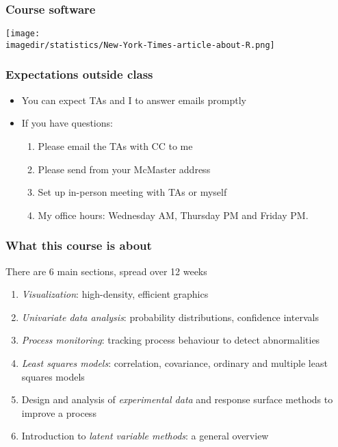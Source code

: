 \begin{frame}\frametitle{Course software}	
	\texttt{[image: \\imagedir/statistics/New-York-Times-article-about-R.png]}
\end{frame}

\begin{frame}\frametitle{Expectations outside class}
	\begin{itemize}
		\item	You can expect TAs and I to answer emails promptly 
		\item	If you have questions: 
		\begin{enumerate}
			\item	Please email the TAs with CC to me \hfill {\tiny{\color{myOrange}{$\longleftarrow$ hopefully this solves your problem}}}
			\item	Please send from your McMaster address
			\item	Set up in-person meeting with TAs or myself 
			\item	My office hours: Wednesday AM, Thursday PM and Friday PM.
		\end{enumerate}
	\end{itemize}
\end{frame}

\begin{frame}\frametitle{What this course is about}
	There are 6 main sections, spread over 12 weeks
	\begin{enumerate}
		\item	\emph{Visualization}: high-density, efficient graphics 
		\item	\emph{Univariate data analysis}: probability distributions, confidence intervals 
		\item	\emph{Process monitoring}: tracking process behaviour to detect abnormalities 
		\item	\emph{Least squares models}: correlation, covariance, ordinary and multiple least squares models 
		\item	Design and analysis of \emph{experimental data} and response surface methods to improve a process 
		\item	Introduction to \emph{latent variable methods}: a general overview 
	\end{enumerate}
\end{frame}

